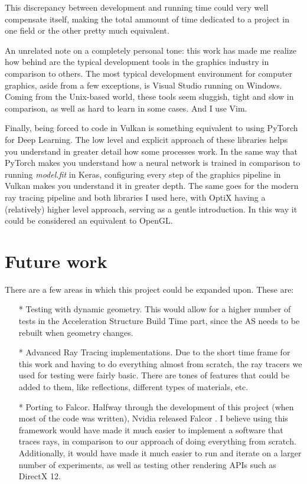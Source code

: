 This discrepancy between development and running time could very well compensate itself, making the total ammount of time dedicated to a project in one field or the other pretty much equivalent.

An unrelated note on a completely personal tone: this work has made me realize how behind are the typical development tools in the graphics industry in comparison to others. The most typical development environment for computer graphics, aside from a few exceptions, is Visual Studio running on Windows. Coming from the Unix-based world, these tools seem sluggish, tight and slow in comparison, as well as hard to learn in some cases. And I use Vim.

Finally, being forced to code in Vulkan is something equivalent to using PyTorch for Deep Learning. The low level and explicit approach of these libraries helps you understand in greater detail how some processes work. In the same way that PyTorch makes you understand how a neural network is trained in comparison to running \textit{model.fit} in Keras, configuring every step of the graphics pipeline in Vulkan makes you understand it in greater depth. The same goes for the modern ray tracing pipeline and both libraries I used here, with OptiX having a (relatively) higher level approach, serving as a gentle introduction. In this way it could be considered an equivalent to OpenGL.

\section{Future work}

There are a few areas in which this project could be expanded upon. These are:

\begin{itemize}
  \item[*]{Testing with dynamic geometry. This would allow for a higher number of tests in the Acceleration Structure Build Time part, since the AS needs to be rebuilt when geometry changes.}
  \item[*]{Advanced Ray Tracing implementations. Due to the short time frame for this work and having to do everything almost from scratch, the ray tracers we used for testing were fairly basic. There are tones of features that could be added to them, like reflections, different types of materials, etc.}
  \item[*]{Porting to Falcor. Halfway through the development of this project (when most of the code was written), Nvidia released Falcor \cite{Kallweit22}. I believe using this framework would have made it much easier to implement a software that traces rays, in comparison to our approach of doing everything from scratch. Additionally, it would have made it much easier to run and iterate on a larger number of experiments, as well as testing other rendering APIs such as DirectX 12.}
\end{itemize}
